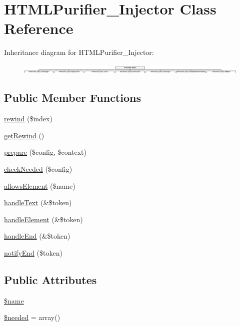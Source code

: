 \hypertarget{classHTMLPurifier__Injector}{\section{H\+T\+M\+L\+Purifier\+\_\+\+Injector Class Reference}
\label{classHTMLPurifier__Injector}
}
Inheritance diagram for H\+T\+M\+L\+Purifier\+\_\+\+Injector\+:\begin{figure}[H]
\begin{center}
\leavevmode
\includegraphics[height=0.490798cm]{classHTMLPurifier__Injector}
\end{center}
\end{figure}
\subsection*{Public Member Functions}
\begin{DoxyCompactItemize}
\item 
\hyperlink{classHTMLPurifier__Injector_aafc212f9cd8f258ab052546eddddd464}{rewind} (\$index)
\item 
\hyperlink{classHTMLPurifier__Injector_a2e2ed92dc6c6984be5673b9ece6769b9}{get\+Rewind} ()
\item 
\hyperlink{classHTMLPurifier__Injector_af9dfe78797df23a6bc4fca0d6804bf63}{prepare} (\$config, \$context)
\item 
\hyperlink{classHTMLPurifier__Injector_a5023610ed8b1a4a1a79fb5a9a8bf5da9}{check\+Needed} (\$config)
\item 
\hyperlink{classHTMLPurifier__Injector_ae55f719c765f5cceb6bef9fa48997916}{allows\+Element} (\$name)
\item 
\hyperlink{classHTMLPurifier__Injector_ac029230af5b0f2da28f45bbb00bd414c}{handle\+Text} (\&\$token)
\item 
\hyperlink{classHTMLPurifier__Injector_afab9eb39c72025d6d99394c6e244c0f2}{handle\+Element} (\&\$token)
\item 
\hyperlink{classHTMLPurifier__Injector_a119063ff0fc484be44de59cf92a59c86}{handle\+End} (\&\$token)
\item 
\hyperlink{classHTMLPurifier__Injector_af6696131c98960ce670a3f3f737ca6e8}{notify\+End} (\$token)
\end{DoxyCompactItemize}
\subsection*{Public Attributes}
\begin{DoxyCompactItemize}
\item 
\hyperlink{classHTMLPurifier__Injector_a15efeb72d86f022fc99513f8d5de5bac}{\$name}
\item 
\hyperlink{classHTMLPurifier__Injector_ae8c48ddbf7a7bd826a8c7a2ce3ab081d}{\$needed} = array()
\end{DoxyCompactItemize}

